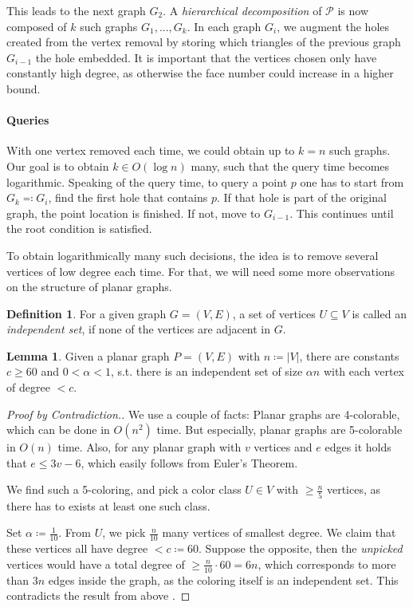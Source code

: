 \documentclass[10pt,fleqn]{article}
\theoremstyle{definition}
\newtheorem{definition}{Definition}
\newtheorem{lemma}{Lemma}
\theoremstyle{remark}
\begin{document}
This leads to the next graph \(G_2\). A \emph{hierarchical decomposition} of \(\mathcal{P}\) is now composed of \(k\) such graphs \(G_1, ..., G_k\). In each graph \(G_i\), we augment the holes created from the vertex removal by storing which triangles of the previous graph \(G_{i-1}\) the hole embedded. It is important that the vertices chosen only have constantly high degree, as otherwise the face number could increase in a higher bound.

\paragraph{Queries} With one vertex removed each time, we could obtain up to \(k = n\) such graphs. Our goal is to obtain \(k \in O(\log{n})\) many, such that the query time becomes logarithmic. Speaking of the query time, to query a point \(p\) one has to start from \(G_k \eqqcolon G_i\), find the first hole that contains \(p\). If that hole is part of the original graph, the point location is finished. If not, move to \(G_{i-1}\). This continues until the root condition is satisfied.

To obtain logarithmically many such decisions, the idea is to remove several vertices of low degree each time. For that, we will need some more observations on the structure of planar graphs.

\begin{definition}
    For a given graph \(G = (V, E)\), a set of vertices \(U \subseteq V\) is called an \emph{independent set}, if none of the vertices are adjacent in \(G\).
\end{definition}


\begin{lemma}
    Given a planar graph \(P = (V, E)\) with \(n \coloneqq |V|\), there are constants \(c \geq 60\) and \(0 < \alpha < 1\), s.t. there is an independent set of size \(\alpha n\) with each vertex of degree \(< c\).
\end{lemma}

\begin{proof}[Proof by Contradiction.]
    We use a couple of facts: Planar graphs are 4-colorable, which can be done in \(O(n^2)\) time. But especially, planar graphs are 5-colorable in \(O(n)\) time. Also, for any planar graph with \(v\) vertices and \(e\) edges it holds that \(e \leq 3v - 6\), which easily follows from Euler's Theorem.
    
    We find such a 5-coloring, and pick a color class \(U \in V\) with \(\geq \frac{n}{5}\) vertices, as there has to exists at least one such class.

    Set \(\alpha \coloneqq \frac{1}{10}\). From \(U\), we pick \(\frac{n}{10}\) many vertices of smallest degree. We claim that these vertices all have degree \(< c \coloneqq 60\). Suppose the opposite, then the \emph{unpicked} vertices would have a total degree of \(\geq \frac{n}{10} \cdot 60 = 6n\), which corresponds to more than \(3n\) edges inside the graph, as the coloring itself is an independent set. This contradicts the result from above \lightning.
\end{proof}
\end{document}
